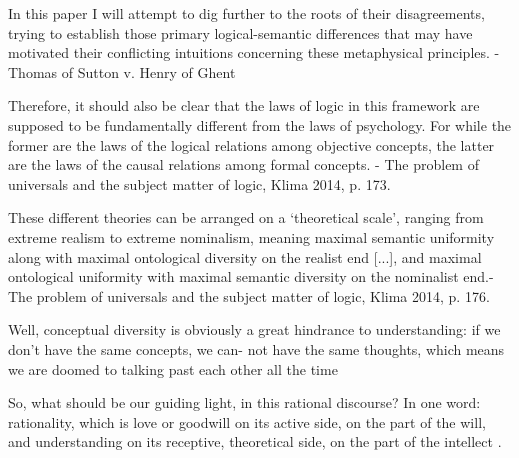 \documentclass[]{article}
\begin{document}
In this paper I will attempt to dig further to the roots of
their disagreements, trying to establish those primary logical-semantic differences that may have
motivated their conflicting intuitions concerning these metaphysical principles. - Thomas of Sutton v. Henry of Ghent

Therefore, it should also be clear that the laws of logic in this framework
are supposed to be fundamentally diﬀerent from the laws of psychology.
For while the former are the laws of the logical relations among objective
concepts, the latter are the laws of the causal relations among formal
concepts. - The problem of universals and the subject matter of logic, Klima 2014, p. 173.

These different theories can be arranged on a `theoretical scale', ranging from extreme realism to extreme nominalism, meaning maximal semantic uniformity along with maximal ontological diversity on the realist end [...], and maximal ontological uniformity with maximal semantic diversity on the nominalist end.- The problem of universals and the subject matter of logic, Klima 2014, p. 176.

Well, conceptual diversity is obviously
a great hindrance to understanding: if we don’t have the same concepts, we can-
not have the same thoughts, which means we are doomed to talking past each
other all the time\autocite[36]{Klima2021}

So, what should be our guiding light, in this rational discourse? In one word:
rationality, which is love or goodwill on its active side, on the part of the will, and
understanding on its receptive, theoretical side, on the part of the intellect \autocite[41]{Klima2021}.
\autocite{Parsons2014,Read2015b}

\printbibliography
\end{document}
